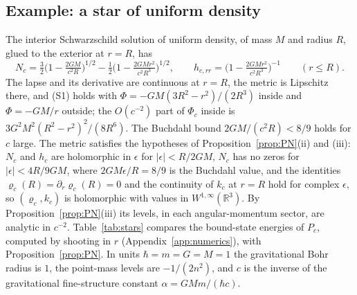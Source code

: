 \documentclass[%
 aip,
 jmp,
 amsmath,amssymb,
 reprint, onecolumn
]{revtex4-1}
\theoremstyle{definition}
\theoremstyle{remark}
\newcommand{\R}{\mathbb{R}}
\begin{document}
\subsection{Example: a star of uniform density}\label{sec:uniform-star}

The interior Schwarzschild solution of uniform density, of mass $M$ and
radius $R$, glued to the exterior at $r=R$, has
\[
N_c=\tfrac32\bigl(1-\tfrac{2GM}{c^2R}\bigr)^{1/2}-\tfrac12\bigl(1-
\tfrac{2GMr^2}{c^2R^3}\bigr)^{1/2},\qquad
h_{c,rr}=\bigl(1-\tfrac{2GMr^2}{c^2R^3}\bigr)^{-1}\qquad(r\leq R).
\]
The lapse and its derivative are continuous at $r=R$, the metric is
Lipschitz there, and (S1) holds with $\Phi=-GM(3R^2-r^2)/(2R^3)$ inside
and $\Phi=-GM/r$ outside; the $O(c^{-2})$ part of $\Phi_c$ inside is
$3G^2M^2(R^2-r^2)^2/(8R^6)$. The Buchdahl bound $2GM/(c^2R)<8/9$ holds
for $c$ large. The metric satisfies the hypotheses of
Proposition~\ref{prop:PN}(ii) and (iii): $N_c$ and $h_c$ are holomorphic
in $\epsilon$ for $|\epsilon|<R/2GM$, $N_c$ has no zeros for
$|\epsilon|<4R/9GM$, where $2GM\epsilon/R=8/9$ is the Buchdahl value, and
the identities $\varrho_c(R)=\partial_r\varrho_c(R)=0$ and the continuity
of $k_c$ at $r=R$ hold for complex $\epsilon$, so $(\varrho_c,k_c)$ is
holomorphic with values in $W^{1,\infty}(\R^3)$. By
Proposition~\ref{prop:PN}(iii) its levels, in each angular-momentum
sector, are analytic in $c^{-2}$. Table~\ref{tab:stars} compares the bound-state energies
of $P_c$, computed by shooting in $r$ (Appendix~\ref{app:numerics}), with
Proposition~\ref{prop:PN}. In units
$\hbar=m=G=M=1$ the gravitational Bohr radius is $1$, the point-mass
levels are $-1/(2n^2)$, and $c$ is the inverse of the gravitational
fine-structure constant $\alpha=GMm/(\hbar c)$.
\end{document}
